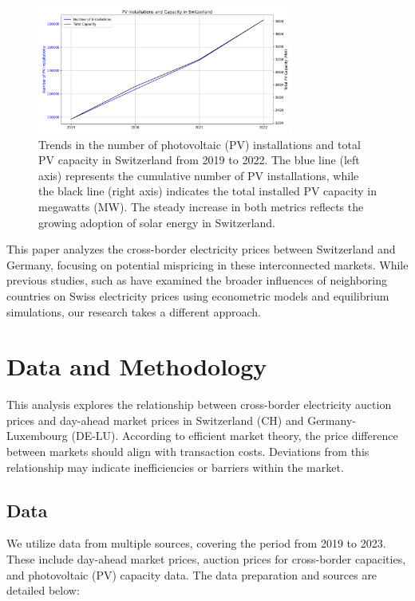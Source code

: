 \documentclass[12pt]{article}
\begin{document}
\begin{figure}[ht]
    \centering
    \includegraphics[width=0.75\textwidth]{figures/pv_installations_switzerland.png}
    \caption{Trends in the number of photovoltaic (PV) installations and total PV capacity in Switzerland from 2019 to 2022. The blue line (left axis) represents the cumulative number of PV installations, while the black line (right axis) indicates the total installed PV capacity in megawatts (MW). The steady increase in both metrics reflects the growing adoption of solar energy in Switzerland.}
    \label{fig:pv_increase}
\end{figure}

This paper analyzes the cross-border electricity prices between Switzerland and Germany, focusing on potential mispricing in these interconnected markets. While previous studies, such as \cite{keles2020cross} have examined the broader influences of neighboring countries on Swiss electricity prices using econometric models and equilibrium simulations, our research takes a different approach. 



\section{Data and Methodology}

This analysis explores the relationship between cross-border electricity auction prices and day-ahead market prices in Switzerland (CH) and Germany-Luxembourg (DE-LU). According to efficient market theory, the price difference between markets should align with transaction costs. Deviations from this relationship may indicate inefficiencies or barriers within the market.

\subsection{Data}

We utilize data from multiple sources, covering the period from 2019 to 2023. These include day-ahead market prices, auction prices for cross-border capacities, and photovoltaic (PV) capacity data. The data preparation and sources are detailed below:
\end{document}
